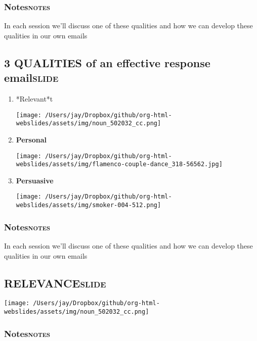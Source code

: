 \documentclass[12pt]{article}
\begin{document}
\subsubsection[Notes]{Notes\hfill{}\textsc{notes}}
\label{sec:orgc232669}
In each session we'll discuss one of these qualities and how we can develop these qualities in our own emails

\subsection[\textbf{3 QUALITIES} of an effective response email]{\textbf{3 QUALITIES} of an effective response email\hfill{}\textsc{slide}}
\label{sec:org605b97d}
\begin{enumerate}
\item *Relevant*t \begin{center}
\texttt{[image: /Users/jay/Dropbox/github/org-html-webslides/assets/img/noun\_502032\_cc.png]}
\end{center}
\item \textbf{Personal} \begin{center}
\texttt{[image: /Users/jay/Dropbox/github/org-html-webslides/assets/img/flamenco-couple-dance\_318-56562.jpg]}
\end{center}
\item \textbf{Persuasive} \begin{center}
\texttt{[image: /Users/jay/Dropbox/github/org-html-webslides/assets/img/smoker-004-512.png]}
\end{center}
\end{enumerate}
\subsubsection[Notes]{Notes\hfill{}\textsc{notes}}
\label{sec:org565732d}
In each session we'll discuss one of these qualities and how we can develop these qualities in our own emails

\subsection[\textbf{RELEVANCE}]{\textbf{RELEVANCE}\hfill{}\textsc{slide}}
\label{sec:org339d8a1}
\begin{center}
\texttt{[image: /Users/jay/Dropbox/github/org-html-webslides/assets/img/noun\_502032\_cc.png]}
\end{center}

\subsubsection[Notes]{Notes\hfill{}\textsc{notes}}
\label{sec:orgb44830b}
\end{document}
